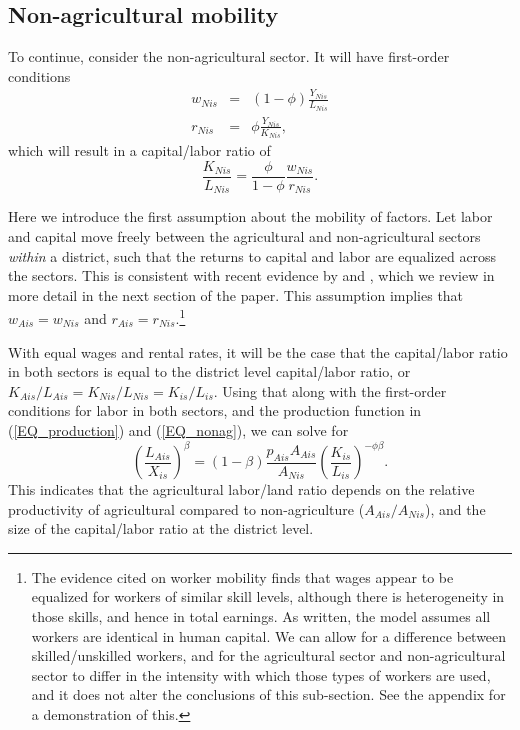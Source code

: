 \subsection{Non-agricultural mobility}
To continue, consider the non-agricultural sector. It will have first-order conditions
\begin{eqnarray*}
    w_{Nis} &=& (1-\phi)\frac{Y_{Nis}}{L_{Nis}} \\ 
    r_{Nis} &=& \phi \frac{Y_{Nis}}{K_{Nis}},
\end{eqnarray*}
which will result in a capital/labor ratio of
\begin{equation*}
	\frac{K_{Nis}}{L_{Nis}} = \frac{\phi}{1-\phi} \frac{w_{Nis}}{r_{Nis}}.
\end{equation*}

Here we introduce the first assumption about the mobility of factors. Let labor and capital move freely between the agricultural and non-agricultural sectors \textit{within} a district, such that the returns to capital and labor are equalized across the sectors. This is consistent with recent evidence by \citet{young2013inequality} and \citet{hklm2017}, which we review in more detail in the next section of the paper. This assumption implies that $w_{Ais} = w_{Nis}$ and $r_{Ais} = r_{Nis}$.\footnote{The evidence cited on worker mobility finds that wages appear to be equalized for workers of similar skill levels, although there is heterogeneity in those skills, and hence in total earnings. As written, the model assumes all workers are identical in human capital. We can allow for a difference between skilled/unskilled workers, and for the agricultural sector and non-agricultural sector to differ in the intensity with which those types of workers are used, and it does not alter the conclusions of this sub-section. See the appendix for a demonstration of this.}

With equal wages and rental rates, it will be the case that the capital/labor ratio in both sectors is equal to the district level capital/labor ratio, or $K_{Ais}/L_{Ais} = K_{Nis}/L_{Nis} = K_{is}/L_{is}$. Using that along with the first-order conditions for labor in both sectors, and the production function in (\ref{EQ_production}) and (\ref{EQ_nonag}), we can solve for
\begin{equation}
	\left(\frac{L_{Ais}}{X_{is}}\right)^{\beta} = (1-\beta) \frac{p_{Ais} A_{Ais}}{A_{Nis}} \left(\frac{K_{is}}{L_{is}} \right)^{-\phi\beta}. \label{EQ_laxdistrict}
\end{equation}
This indicates that the agricultural labor/land ratio depends on the relative productivity of agricultural compared to non-agriculture ($A_{Ais}/A_{Nis}$), and the size of the capital/labor ratio at the district level. 

